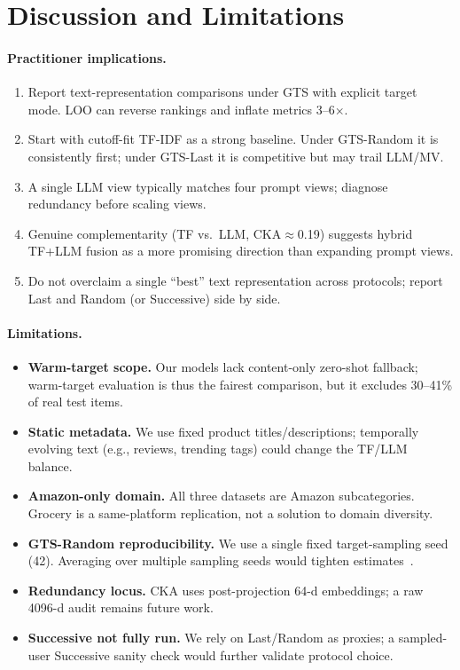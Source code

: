 \documentclass[sigconf,natbib=true,anonymous]{acmart}
\newcommand{\tfidf}{\textsc{TF-IDF}\xspace}
\newcommand{\llm}{\textsc{LLM}\xspace}
\begin{document}
\section{Discussion and Limitations}
\label{sec:discussion}

\paragraph{Practitioner implications.}
\begin{enumerate}[leftmargin=*,itemsep=2pt]
\item Report text-representation comparisons under GTS with explicit target mode.  LOO can reverse rankings and inflate metrics 3--6$\times$.
\item Start with cutoff-fit \tfidf as a strong baseline.  Under GTS-Random it is consistently first; under GTS-Last it is competitive but may trail LLM/MV.
\item A single \llm view typically matches four prompt views; diagnose redundancy before scaling views.
\item Genuine complementarity (TF vs.\ LLM, CKA$\approx$0.19) suggests hybrid TF+LLM fusion as a more promising direction than expanding prompt views.
\item Do not overclaim a single ``best'' text representation across protocols; report Last and Random (or Successive) side by side.
\end{enumerate}

\paragraph{Limitations.}
\begin{itemize}[leftmargin=*,itemsep=1pt]
\item \textbf{Warm-target scope.}
Our models lack content-only zero-shot fallback; warm-target evaluation is thus the fairest comparison, but it excludes 30--41\% of real test items.
\item \textbf{Static metadata.}
We use fixed product titles/descriptions; temporally evolving text (e.g., reviews, trending tags) could change the TF/LLM balance.
\item \textbf{Amazon-only domain.}
All three datasets are Amazon subcategories.  Grocery is a same-platform replication, not a solution to domain diversity.
\item \textbf{GTS-Random reproducibility.}
We use a single fixed target-sampling seed (42).  Averaging over multiple sampling seeds would tighten estimates~\cite{liang2024timetosplit}.
\item \textbf{Redundancy locus.}
CKA uses post-projection 64-d embeddings; a raw 4096-d audit remains future work.
\item \textbf{Successive not fully run.}
We rely on Last/Random as proxies; a sampled-user Successive sanity check would further validate protocol choice.
\end{itemize}
\end{document}
